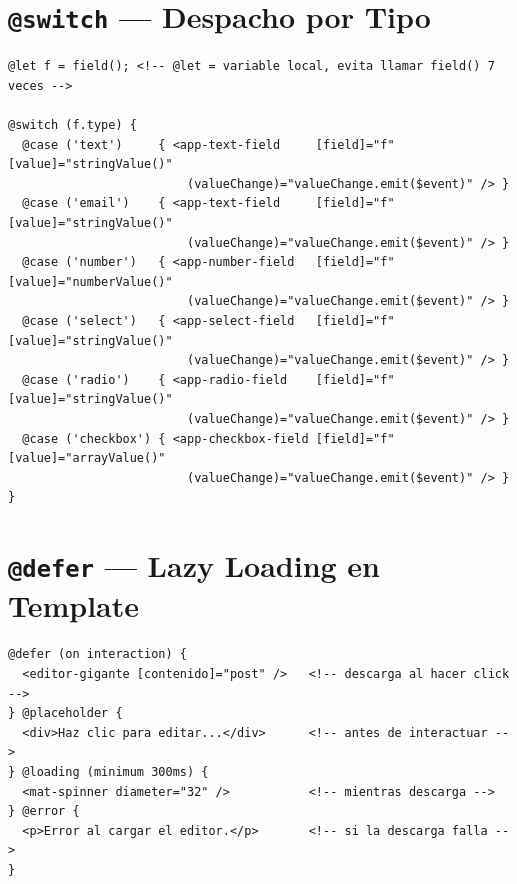 \documentclass[12pt, a4paper]{article}
\begin{document}
\section{  \texttt{@switch} — Despacho por Tipo}

\begin{lstlisting}
@let f = field(); <!-- @let = variable local, evita llamar field() 7 veces -->

@switch (f.type) {
  @case ('text')     { <app-text-field     [field]="f" [value]="stringValue()"
                         (valueChange)="valueChange.emit($event)" /> }
  @case ('email')    { <app-text-field     [field]="f" [value]="stringValue()"
                         (valueChange)="valueChange.emit($event)" /> }
  @case ('number')   { <app-number-field   [field]="f" [value]="numberValue()"
                         (valueChange)="valueChange.emit($event)" /> }
  @case ('select')   { <app-select-field   [field]="f" [value]="stringValue()"
                         (valueChange)="valueChange.emit($event)" /> }
  @case ('radio')    { <app-radio-field    [field]="f" [value]="stringValue()"
                         (valueChange)="valueChange.emit($event)" /> }
  @case ('checkbox') { <app-checkbox-field [field]="f" [value]="arrayValue()"
                         (valueChange)="valueChange.emit($event)" /> }
}
\end{lstlisting}

\section{  \texttt{@defer} — Lazy Loading en Template}

\begin{lstlisting}
@defer (on interaction) {
  <editor-gigante [contenido]="post" />   <!-- descarga al hacer click -->
} @placeholder {
  <div>Haz clic para editar...</div>      <!-- antes de interactuar -->
} @loading (minimum 300ms) {
  <mat-spinner diameter="32" />           <!-- mientras descarga -->
} @error {
  <p>Error al cargar el editor.</p>       <!-- si la descarga falla -->
}
\end{lstlisting}
\end{document}
